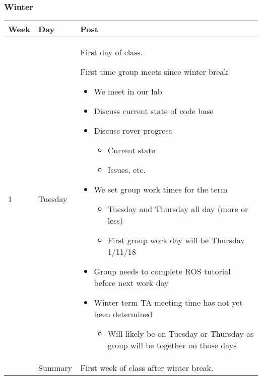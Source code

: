 \subsubsection{Winter}
\begin{longtable}{ | l | l | p{14cm} | }
\hline
Week & Day & Post \\
\hline
1 & Tuesday & First day of class. 

First time group meets since winter break
\begin{itemize}
\item We meet in our lab
\item Discuss current state of code base
\item Discuss rover progress
\begin{itemize}
\item Current state
\item Issues, etc.
\end{itemize}
\item We set group work times for the term
\begin{itemize}
\item Tuesday and Thursday all day (more or less)
\item First group work day will be Thursday 1/11/18
\end{itemize}
\item Group needs to complete ROS tutorial before next work day
\item Winter term TA meeting time has not yet been determined 
\begin{itemize}
\item Will likely be on Tuesday or Thursday as group will be together on those days
\end{itemize}
\end{itemize}
\\
\cline{2-3}
 & Summary & 
First week of class after winter break.


\end{longtable}
